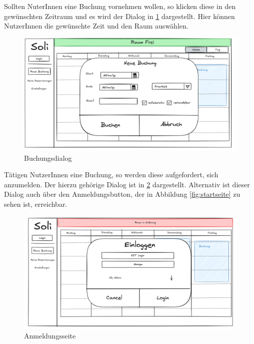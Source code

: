 Sollten NuterInnen eine Buchung vornehmen wollen, so klicken diese in den gewünschten Zeitraum
und es wird der Dialog in \ref{fig:buchung} dargestellt.
Hier können NutzerInnen die gewünschte Zeit und den Raum auswählen.
\begin{figure}[ht]
    \centering
    \includegraphics[scale=0.15]{figures/ui/buchungsdialog}
    \caption{Buchungsdialog}
    \label{fig:buchung}
\end{figure}
\clearpage

Tätigen NutzerInnen eine Buchung, so werden diese aufgefordert, sich anzumelden.
Der hierzu gehörige Dialog ist in \ref{fig:login} dargestellt.
Alternativ ist dieser Dialog auch über den Anmeldungsbutton, der in Abbildung \ref{fig:startseite} zu sehen ist, erreichbar.
\begin{figure}[ht]
    \centering
    \includegraphics[scale=0.15]{figures/ui/anmeldungsseite}
    \caption{Anmeldungsseite}
    \label{fig:login}
\end{figure}
\clearpage

